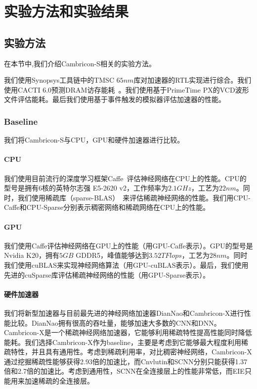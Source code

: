 \chapter{实验方法和实验结果}


\section{实验方法}
在本节中,我们介绍Cambricon-S相关的实验方法。

我们使用Synopsys工具链中的TMSC $65nm$库对加速器的RTL实现进行综合。我们使用CACTI 6.0预测DRAM访存能耗~\cite{muralimanohar2007optimizing}。我们使用基于PrimeTime PX的VCD波形文件评估能耗。最后我们使用基于事件触发的模拟器评估加速器的性能。

\subsection{Baseline}
我们将Cambricon-S与CPU，GPU和硬件加速器进行比较。

\subsubsection{CPU}
我们使用目前流行的深度学习框架Caffe~\cite{jia2014caffe}评估神经网络在CPU上的性能。CPU的型号是拥有6核的英特尔志强 E5-2620 v2，工作频率为$2.1GHz$，工艺为$22nm$。同时，我们使用稀疏库（sparse-BLAS）~\cite{duff2002overview}来评估稀疏神经网络的性能。我们用CPU-Caffe和CPU-Sparse分别表示稠密网络和稀疏网络在CPU上的性能。

\subsubsection{GPU}
我们使用Caffe评估神经网络在GPU上的性能（用GPU-Caffe表示）。GPU的型号是Nvidia K20，拥有$5GB$ GDDR5，峰值能够达到$3.52TFlops$，工艺为$28nm$。同时我们使用cuBLAS来实现神经网络算法（用GPU-cuBLAS表示）。最后，我们使用先进的cuSparse库评估稀疏神经网络的性能（用GPU-Sparse表示）。

\subsubsection{硬件加速器}
我们将新型加速器与目前最先进的神经网络加速器DianNao和Cambricon-X进行性能比较。DianNao拥有很高的吞吐量，能够加速大多数的CNN和DNN。Cambricon-X是一个稀疏神经网络加速器，它能够利用稀疏特性提高性能同时降低能耗。我们选择Cambricon-X作为baseline，主要是考虑到它能够最大程度利用稀疏特性，并且具有通用性。考虑到稀疏利用率，对比稠密神经网络，Cambricon-X通过挖掘稀疏性能够获得2.93倍的加速比，而Cnvlutin和SCNN分别只能获得1.37倍和2.7倍的加速比。考虑到通用性，SCNN在全连接层上的性能非常低，而EIE只能用来加速稀疏的全连接层。


